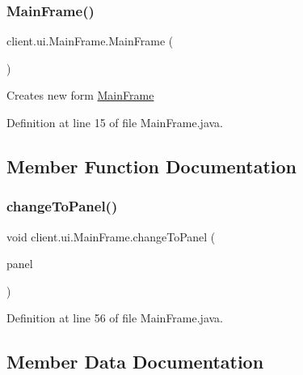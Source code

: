 \subsubsection{\texorpdfstring{Main\+Frame()}{MainFrame()}}
{\footnotesize\ttfamily client.\+ui.\+Main\+Frame.\+Main\+Frame (\begin{DoxyParamCaption}{ }\end{DoxyParamCaption})}

Creates new form \hyperlink{classclient_1_1ui_1_1_main_frame}{Main\+Frame} 

Definition at line 15 of file Main\+Frame.\+java.



\subsection{Member Function Documentation}
\hypertarget{classclient_1_1ui_1_1_main_frame_ae415687be6f7197dd0d70d65d08d5221}{}\label{classclient_1_1ui_1_1_main_frame_ae415687be6f7197dd0d70d65d08d5221} 
\subsubsection{\texorpdfstring{change\+To\+Panel()}{changeToPanel()}}
{\footnotesize\ttfamily void client.\+ui.\+Main\+Frame.\+change\+To\+Panel (\begin{DoxyParamCaption}\item[{javax.\+swing.\+J\+Component}]{panel }\end{DoxyParamCaption})}



Definition at line 56 of file Main\+Frame.\+java.



\subsection{Member Data Documentation}
\hypertarget{classclient_1_1ui_1_1_main_frame_adc5b4f5b4aa376358a04eddef4741233}{}\label{classclient_1_1ui_1_1_main_frame_adc5b4f5b4aa376358a04eddef4741233} 
